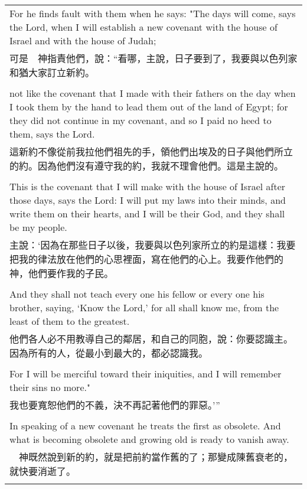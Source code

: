 \begin{tabularx}{\textwidth}{p{}}
For he finds fault with them when he says:  "The days will come, says the Lord, when I will establish a new covenant with the house of Israel and with the house of Judah; \\
可是　神指責他們，說：“看哪，主說，日子要到了，我要與以色列家和猶大家訂立新約。 \\ \\
not like the covenant that I made with their fathers on the day when I took them by the hand to lead them out of the land of Egypt; for they did not continue in my covenant, and so I paid no heed to them, says the Lord. \\
這新約不像從前我拉他們祖先的手，領他們出埃及的日子與他們所立的約。因為他們沒有遵守我的約，我就不理會他們。這是主說的。 \\ \\
This is the covenant that I will make with the house of Israel after those days, says the Lord: I will put my laws into their minds, and write them on their hearts, and I will be their God, and they shall be my people. \\
主說：‘因為在那些日子以後，我要與以色列家所立的約是這樣：我要把我的律法放在他們的心思裡面，寫在他們的心上。我要作他們的　神，他們要作我的子民。 \\ \\
And they shall not teach every one his fellow or every one his brother, saying, `Know the Lord,' for all shall know me, from the least of them to the greatest. \\
他們各人必不用教導自己的鄰居，和自己的同胞，說：你要認識主。因為所有的人，從最小到最大的，都必認識我。 \\ \\
For I will be merciful toward their iniquities, and I will remember their sins no more." \\
我也要寬恕他們的不義，決不再記著他們的罪惡。’” \\ \\
In speaking of a new covenant he treats the first as obsolete. And what is becoming obsolete and growing old is ready to vanish away. \\
　神既然說到新的約，就是把前約當作舊的了；那變成陳舊衰老的，就快要消逝了。 \\ \\

\hline
\end{tabularx}

